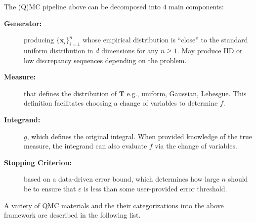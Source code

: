 \documentclass[graybox]{svmult}
\begin{document}
The (Q)MC pipeline above can be decomposed into $4$ main components:
\begin{description}
    \item[\textbf{Generator:}] producing $\{\boldsymbol{x}_i\}_{i=1}^n$ whose empirical distribution is ``close'' to the standard uniform distribution in $d$ dimensions for any $n \geq 1$.  May produce IID or low discrepancy sequences depending on the problem.
    \item[\textbf{Measure:}] that defines the distribution of $\boldsymbol{T}$ e.g., uniform, Gaussian, Lebesgue. This definition facilitates choosing a change of variables to determine $f$.
    \item[\textbf{Integrand:}] $g$, which defines the original integral. When provided knowledge of the true measure, the integrand can also evaluate $f$ via the change of variables.
    \item[\textbf{Stopping Criterion:}] based on a data-driven error bound, which determines how large $n$ should be to ensure that $\varepsilon$ is less than some user-provided error threshold.
\end{description}
A variety of QMC materials and the their categorizations into the above framework are described in the following list.
\end{document}
